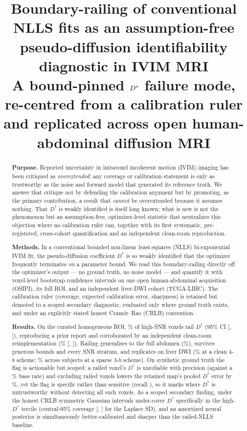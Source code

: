 \documentclass[11pt]{article}
\title{\textbf{Boundary-railing of conventional NLLS fits as an assumption-free
pseudo-diffusion identifiability diagnostic in IVIM MRI}\\[3pt]
\large A bound-pinned $\Ds$ failure mode, re-centred from a calibration ruler and
replicated across open human-abdominal diffusion MRI}
\author[ ]{ }
\affil[ ]{ }
\date{}
\newcommand{\Ds}{D^{*}}
\begin{document}
\maketitle

\begin{abstract}
\noindent
\textbf{Purpose.} Reported uncertainty in intravoxel incoherent motion (IVIM)
imaging has been critiqued as \emph{overextended}: any coverage or calibration
statement is only as trustworthy as the noise and forward model that generated
its reference truth. We answer that critique not by defending the calibration
argument but by promoting, as the primary contribution, a result that
\emph{cannot} be overextended because it assumes nothing. That $\Ds$ is weakly
identified is itself long known; what is new is not the phenomenon but an
assumption-free, optimizer-level statistic that neutralizes this objection where
no calibration ruler can, together with its first systematic, pre-registered,
cross-cohort quantification and an independent clean-room reproduction.

\textbf{Methods.} In a conventional bounded non-linear least-squares (NLLS)
bi-exponential IVIM fit, the pseudo-diffusion coefficient $\Ds$ is so weakly
identified that the optimizer frequently terminates \emph{on} a parameter bound.
We read this boundary-railing directly off the optimizer's output --- no ground
truth, no noise model --- and quantify it with voxel-level bootstrap confidence
intervals on one open human-abdominal acquisition (OSIPI), its full ROI, and an
independent liver-DWI cohort (TCGA-LIHC). The calibration ruler (coverage,
expected calibration error, sharpness) is retained but demoted to a scoped
secondary diagnostic, evaluated only where ground truth exists, and under an
explicitly stated honest Cram\'er--Rao (CRLB) convention.

\textbf{Results.} On the curated homogeneous ROI, \HomoFrac\% of \HomoN{}
high-SNR voxels rail $\Ds$ (95\% CI [\HomoCIlo, \HomoCIhi]), reproducing a prior
report and corroborated by an independent clean-room reimplementation
(\gnomonRailFrac\% [\gnomonRailCIlo, \gnomonRailCIhi]). Railing generalises to the
full abdomen (\FullFrac\%), survives generous bounds and every SNR stratum, and
replicates on liver DWI (\LihcFourFrac\% at a clean 4-$b$ scheme;
\LihcThreeFrac\% across \LihcThreeSubj{} subjects at a sparse 3-$b$ scheme).
On synthetic ground truth the flag is actionable but scoped: a railed voxel's
$\Ds$ is unreliable with precision \flagPrecTwenty{} (against a \flagBaseTwenty\%
base rate) and excluding railed voxels lowers the retained map's pooled $\Ds$
error by \flagExclRedTwenty\%, yet the flag is specific rather than sensitive
(recall \flagRecTwenty), so it marks where $\Ds$ is untrustworthy without
detecting all such voxels.
As a scoped secondary finding, under the honest CRLB symmetric Gaussian intervals
under-cover $\Ds$ specifically in the high-$\Ds$ tercile (central-95\% coverage
\covLapHonHigh{} [\covLapHonHighLo, \covLapHonHighHi] for the Laplace SD), and an
amortized neural posterior is simultaneously better-calibrated and sharper than
the railed-NLLS baseline.


\end{abstract}
\end{document}
